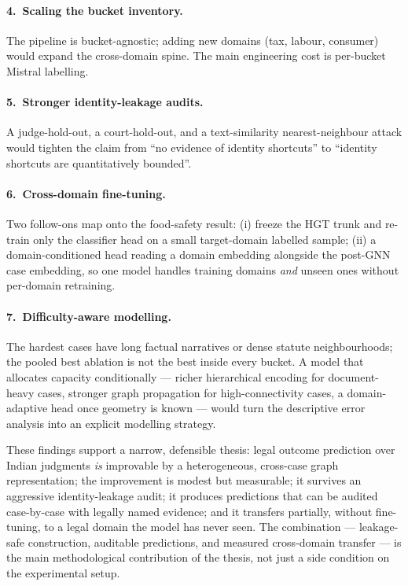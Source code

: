 \paragraph{4.\ Scaling the bucket inventory.} The pipeline is bucket-agnostic; adding new domains (tax, labour, consumer) would expand the cross-domain spine. The main engineering cost is per-bucket Mistral labelling.

\paragraph{5.\ Stronger identity-leakage audits.} A judge-hold-out, a court-hold-out, and a text-similarity nearest-neighbour attack would tighten the claim from ``no evidence of identity shortcuts'' to ``identity shortcuts are quantitatively bounded''.

\paragraph{6.\ Cross-domain fine-tuning.} Two follow-ons map onto the food-safety result: (i) freeze the HGT trunk and re-train only the classifier head on a small target-domain labelled sample; (ii) a domain-conditioned head reading a domain embedding alongside the post-GNN case embedding, so one model handles training domains \emph{and} unseen ones without per-domain retraining.

\paragraph{7.\ Difficulty-aware modelling.} The hardest cases have long factual narratives or dense statute neighbourhoods; the pooled best ablation is not the best inside every bucket. A model that allocates capacity conditionally --- richer hierarchical encoding for document-heavy cases, stronger graph propagation for high-connectivity cases, a domain-adaptive head once geometry is known --- would turn the descriptive error analysis into an explicit modelling strategy.

\medskip

These findings support a narrow, defensible thesis: legal outcome prediction over Indian judgments \emph{is} improvable by a heterogeneous, cross-case graph representation; the improvement is modest but measurable; it survives an aggressive identity-leakage audit; it produces predictions that can be audited case-by-case with legally named evidence; and it transfers partially, without fine-tuning, to a legal domain the model has never seen. The combination --- leakage-safe construction, auditable predictions, and measured cross-domain transfer --- is the main methodological contribution of the thesis, not just a side condition on the experimental setup.
